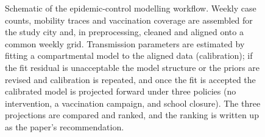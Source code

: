 \documentclass{article}
\begin{document}
\begin{figure}[htbp]
\begin{tikzpicture}
\end{tikzpicture}
\caption{Schematic of the epidemic-control modelling workflow. Weekly case counts,
mobility traces and vaccination coverage are assembled for the study city and, in
preprocessing, cleaned and aligned onto a common weekly grid. Transmission
parameters are estimated by fitting a compartmental model to the aligned data
(calibration); if the fit residual is unacceptable the model structure or the
priors are revised and calibration is repeated, and once the fit is accepted the
calibrated model is projected forward under three policies (no intervention, a
vaccination campaign, and school closure). The three projections are compared and
ranked, and the ranking is written up as the paper's recommendation.}
\end{figure}
\end{document}
